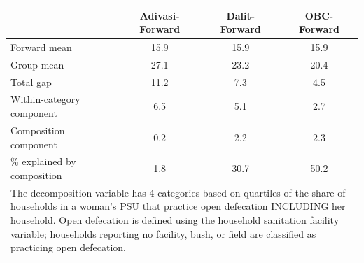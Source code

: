 \begin{tabular}{l*{3}{c}}
\hline\hline
            &\multicolumn{1}{c}{Adivasi-Forward}&\multicolumn{1}{c}{Dalit-Forward}&\multicolumn{1}{c}{OBC-Forward}\\
\hline
\hline
Forward mean&        15.9&        15.9&        15.9\\
Group mean  &        27.1&        23.2&        20.4\\
Total gap   &        11.2&         7.3&         4.5\\
Within-category component&         6.5&         5.1&         2.7\\
Composition component&         0.2&         2.2&         2.3\\
\% explained by composition&         1.8&        30.7&        50.2\\
\hline\hline
\multicolumn{4}{l}{\footnotesize \parbox[t]{0.95\linewidth}{The decomposition variable has 4 categories based on quartiles of the share of households in a woman's PSU that practice open defecation INCLUDING her household. Open defecation is defined using the household sanitation facility variable; households reporting no facility, bush, or field are classified as practicing open defecation.}}\\
\end{tabular}

